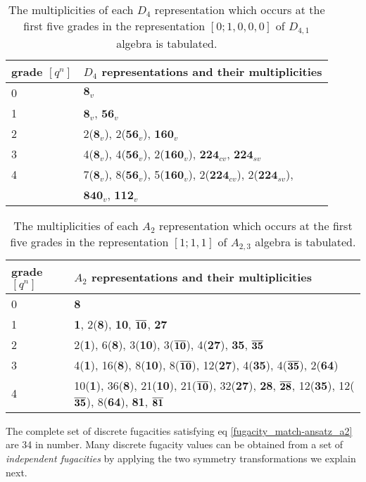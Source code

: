 \documentclass[a4paper,12pt]{article}
\begin{document}
\begin{table}
\centering
\begin{tabular}{ |p{1.8cm}|p{8.5cm}|  } 
\hline
grade $[q^n]$ & $D_4$ representations and their multiplicities \\
\hline
0 & {$\mathbf{8}_v$} \\
\hline
1 &  {$\mathbf{8}_v$}, {$\mathbf{56}_v$}\\
\hline
2 & 2({$\mathbf{8}_v$}), 2({$\mathbf{56}_v$}), {$\mathbf{160}_v$}\\
\hline
3 & 4({$\mathbf{8}_v$}), 4({$\mathbf{56}_v$}), 2({$\mathbf{160}_v$}), {$\mathbf{224}_{cv}$},  {$\mathbf{224}_{sv}$}\\
\hline
4 & 7({$\mathbf{8}_v$}), 8({$\mathbf{56}_v$}), 5({$\mathbf{160}_v$}), 2({$\mathbf{224}_{cv}$}), 2({$\mathbf{224}_{sv}$}),\\ & {$\mathbf{840}_v$}, {$\mathbf{112}_v$}\\
\hline
\end{tabular}
\caption{The multiplicities of each $D_4$ representation which occurs at the first five grades in the representation $[0;1,0,0,0]$ of $D_{4,1}$ algebra is tabulated.}
\label{table: char_table_d4_level_1}
\end{table}

\begin{table}
\centering
\begin{tabular}{ |p{1.8cm}|p{8.5cm}|  } 
\hline
grade $[q^n]$ & $A_2$ representations and their multiplicities\cite{kass1990affine} \\
\hline
0 & {\bf 8} \\
\hline
1 &  {\bf 1}, 2({\bf 8}), {\bf 10}, {$\overline{\bf 10}$}, {\bf 27}\\
\hline
2 & 2({\bf 1}), 6({\bf 8}), 3({\bf 10}), 3({$\overline{\bf 10}$}), 4({\bf 27}), {\bf 35}, {$\overline{\bf 35}$}\\
\hline
3 & 4({\bf 1}), 16({\bf 8}), 8({\bf 10}), 8({$\overline{\bf 10}$}), 12({\bf 27}), 4({\bf 35}), 4({$\overline{\bf 35}$}), 2({\bf 64})\\
\hline
4 & 10({\bf 1}), 36({\bf 8}), 21({\bf 10}), 21({$\overline{\bf 10}$}), 32({\bf 27}), {\bf 28}, {$\overline{\bf 28}$}, 12({\bf 35}), 12({$\overline{\bf 35}$}), 8({\bf 64}), {\bf 81}, {$\overline{\bf 81}$}\\
\hline
\end{tabular}
\caption{The multiplicities of each $A_2$ representation which occurs at the first five grades in the representation $[1;1,1]$ of $A_{2,3}$ algebra is tabulated.}
\label{table: char_table_A2-3}
\end{table}
The complete set of discrete fugacities satisfying eq \ref{fugacity_match-ansatz_a2} are 34 in number. Many discrete fugacity values can be obtained from a set of \textit{independent fugacities} by applying the two symmetry transformations we explain next.
\end{document}
